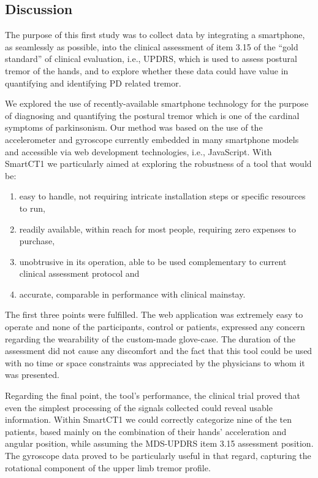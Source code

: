 \subsection{Discussion}
\label{subsec:SmartCT1Discussion}
The purpose of this first study was to collect data by integrating a smartphone, as seamlessly as possible, into the clinical assessment of item 3.15 of the ``gold standard'' of clinical evaluation, i.e., \gls{UPDRS}, which is used to assess postural tremor of the hands, and to explore whether these data could have value in quantifying and identifying \gls{PD} related tremor. 

We explored the use of recently-available smartphone technology for the purpose of diagnosing and quantifying the postural tremor which is one of the cardinal symptoms of parkinsonism. Our method was based on the use of the accelerometer and gyroscope currently embedded in many smartphone models and accessible via web development technologies, i.e., JavaScript. 
With \gls{SmartCT1} we particularly aimed at exploring the robustness of a tool that would be:

\begin{enumerate}
\item easy to handle, not requiring intricate installation steps or specific resources to run, 
\item readily available, within reach for most people, requiring zero expenses to purchase,
\item unobtrusive in its operation, able to be used complementary to current clinical assessment protocol and
\item accurate, comparable in performance with clinical mainstay.
\end{enumerate}

The first three points were fulfilled. The web application was extremely easy to operate and none of the participants, control or patients, expressed any concern regarding the wearability of the custom-made glove-case. The duration of the assessment did not cause any discomfort and the fact that this tool could be used with no time or space constraints was appreciated by the physicians to whom it was presented. 

Regarding the final point, the tool's performance, the clinical trial proved that even the simplest processing of the signals collected could reveal usable information. Within \gls{SmartCT1} we could correctly categorize nine of the ten patients, based mainly on the combination of their hands' acceleration and angular position, while assuming the \gls{MDS}-\gls{UPDRS} item 3.15 assessment position. The gyroscope data proved to be particularly useful in that regard, capturing the rotational component of the upper limb tremor profile. 

